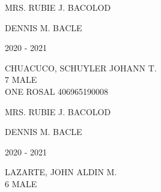 \documentclass{article}
\begin{document}
{{\begin{multicols}{2}
\vspace*{25mm}
\begin{flushright}
MRS. RUBIE J. BACOLOD \hspace*{-1.5em}
\end{flushright}  
\vspace*{1.5mm}
\hspace*{3em} DENNIS M. BACLE
\end{multicols} 
\newpage
\begin{multicols}{2}
\phantom{u}
\columnbreak
\vspace*{-3mm}
\begin{center}
\phantom{school year:} \hspace*{6em} 2020 - 2021 
\end{center} 
\vspace{4mm} 
\phantom{Name:} \hspace*{5em} CHUACUCO, SCHUYLER JOHANN T. \\[2.5mm] %
\phantom{Age} \hspace*{8em} 7  \phantom{Sex} \hspace*{12em} MALE \\[2.5mm] %
\phantom{Grade} \hspace*{3em} ONE \phantom{Section} \hspace*{4em} ROSAL \phantom{LRN} \hspace*{4em} 406965190008 \\
\vspace*{25mm}
\begin{flushright}
MRS. RUBIE J. BACOLOD \hspace*{-1.5em}
\end{flushright}  
\vspace*{1.5mm}
\hspace*{3em} DENNIS M. BACLE
\end{multicols} 
\newpage
\begin{multicols}{2}
\phantom{u}
\columnbreak
\vspace*{-3mm}
\begin{center}
\phantom{school year:} \hspace*{6em} 2020 - 2021 
\end{center} 
\vspace{4mm} 
\phantom{Name:} \hspace*{5em} LAZARTE, JOHN ALDIN M. \\[2.5mm] %
\phantom{Age} \hspace*{8em} 6  \phantom{Sex} \hspace*{12em} MALE \\[2.5mm] %

\end{multicols}}}
\end{document}
